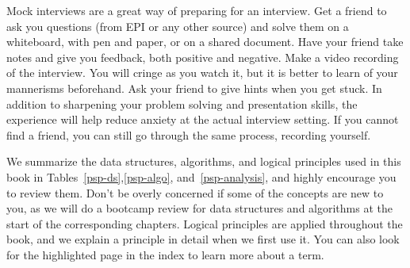 \documentclass[10pt,openany,twoside,letterpaper,extrafontsizes]{memoir}
\begin{document}
\begin{Spacing}{\gettingReadySpacing}

\noindent
Mock interviews are a great way of preparing for an interview.
Get a friend to ask you questions (from EPI
or any other source) and solve them on a whiteboard, with pen and paper, or on a shared
document. Have your friend
take notes and give you feedback, both positive and negative.
Make  a video recording of the interview.
You will cringe as you watch it,
but it is better to learn of your mannerisms beforehand.
Ask your friend to give hints when you get stuck.
In addition to sharpening your problem solving and presentation skills,
the experience will help reduce anxiety at the actual interview setting.
If you cannot find a friend, you can still
go through the same process, recording yourself.


We summarize the data structures, algorithms, and logical principles
used in this book in Tables~\vref{psp-ds},\vref{psp-algo},
and~\vref{psp-analysis}, and highly encourage you to review them.
Don't be overly concerned if some of the
concepts are new to you, as we will do a bootcamp review for data structures
and algorithms at the start of the corresponding chapters.
Logical principles are applied throughout the book, and we explain a
principle in detail when we first use it.
You can also look for the highlighted page in the index to
learn more about a term.



\end{Spacing}
\end{document}
